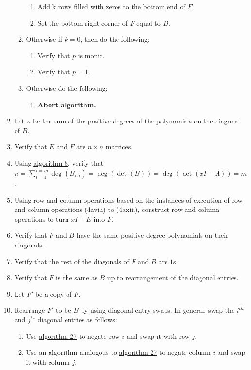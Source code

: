 \documentclass[twocolumn]{article}
\begin{document}
\begin{enumerate}
\begin{enumerate}
\begin{enumerate}
						\item Add k rows filled with zeros to the bottom end of $F$.
						\item Set the bottom-right corner of $F$ equal to $D$.
					\end{enumerate}
					\item Otherwise if $k=0$, then do the following:
					\begin{enumerate}
						\item Verify that $p$ is monic.
						\item Verify that $p=1$.
					\end{enumerate}
					\item Otherwise do the following:
					\begin{enumerate}
						\item \textbf{Abort algorithm.}
					\end{enumerate}
				\end{enumerate}
				\item Let $n$ be the sum of the positive degrees of the polynomials on the diagonal of $B$.
				\item Verify that $E$ and $F$ are $n\times n$ matrices.
				\item Using \hyperref[sec:algorithm 8]{algorithm 8}, verify that $n=\sum_{i=1}^{i=m}\deg(B_{i,i})=\deg(\det(B))=\deg(\det(xI-A))=m$.
				\item Using row and column operations based on the instances of execution of row and column operations (4aviii) to (4axiii), construct row and column operations to turn $xI-E$ into $F$.
				\item Verify that $F$ and $B$ have the same positive degree polynomials on their diagonals.
				\item Verify that the rest of the diagonals of $F$ and $B$ are $1$s.
				\item Verify that $F$ is the same as $B$ up to rearrangement of the diagonal entries.
				\item Let $F'$ be a copy of $F$.
				\item Rearrange $F'$ to be $B$ by using diagonal entry swaps. In general, swap the $i^{th}$ and $j^{th}$ diagonal entries as follows:
				\begin{enumerate}
					\item Use \hyperref[sec:algorithm 27]{algorithm 27} to negate row $i$ and swap it with row $j$.
					\item Use an algorithm analogous to \hyperref[sec:algorithm 27]{algorithm 27} to negate column $i$ and swap it with column $j$.

\end{enumerate}
\end{enumerate}
\end{document}
